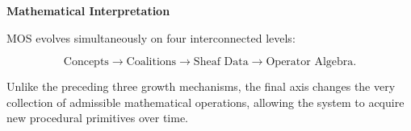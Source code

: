 
\begin{remarkbox}

\BodyFont

\textbf{Mathematical Interpretation}

MOS evolves simultaneously on four interconnected levels:

\[
\boxed{
\text{Concepts}
\rightarrow
\text{Coalitions}
\rightarrow
\text{Sheaf Data}
\rightarrow
\text{Operator Algebra}.
}
\]

Unlike the preceding three growth mechanisms, the final axis changes the
very collection of admissible mathematical operations, allowing the
system to acquire new procedural primitives over time.

\end{remarkbox}